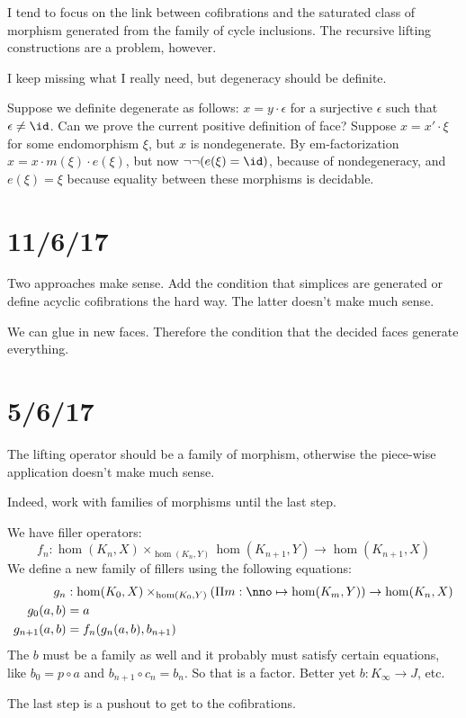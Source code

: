 \documentclass{tac}
\newcommand\of{:}
\newcommand\product[2]{\Pi #1 \mapsto #2}
\begin{document}
I tend to focus on the link between cofibrations and the saturated class of morphism generated from the family of cycle inclusions.
The recursive lifting constructions are a problem, however.

I keep missing what I really need, but degeneracy should be definite.

Suppose we definite degenerate as follows: $x=y\cdot\epsilon$ for a surjective $\epsilon$ such that $\epsilon\neq\id$.
Can we prove the current positive definition of face?
Suppose $x=x'\cdot\xi$ for some endomorphism $\xi$, but $x$ is nondegenerate. By em-factorization $x = x \cdot m(\xi)\cdot e(\xi)$, but now $\neg\neg(e(\xi)=\id)$, because of nondegeneracy, and $e(\xi) = \xi$ because equality between these morphisms is decidable.



\section{11/6/17}
Two approaches make sense. Add the condition that simplices are
generated or define acyclic cofibrations the hard way.
The latter doesn't make much sense.

We can glue in new faces. Therefore the condition that the decided
faces generate everything.

\section{5/6/17}
The lifting operator should be a family of morphism, otherwise
the piece-wise application doesn't make much sense.

Indeed, work with families of morphisms until the last step.

We have filler operators:
\[ f_n\of \hom(K_n,X)\times_{\hom(K_n,Y)}\hom(K_{n+1},Y) \to \hom(K_{n+1},X) \]
We define a new family of fillers using the following equations:
\begin{align*}
g_n &\of \hom(K_0,X)\times_{\hom(K_0,Y)}(\product{m\of\nno}\hom(K_m,Y))\to \hom(K_n,X)\\
g_0(a,b) &= a\\
g_{n+1}(a,b) &= f_n(g_n(a,b),b_{n+1})
\end{align*}
The $b$ must be a family as well and it probably must satisfy certain equations, like $b_0 = p\circ a$ and $b_{n+1}\circ c_n = b_n$.
So that is a factor.
Better yet $b\of K_\infty \to J$, etc.

The last step is a pushout to get to the cofibrations.
\end{document}
